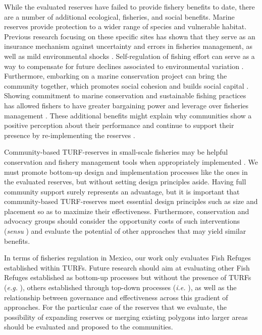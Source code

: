 \documentclass{frontiersSCNS}
\begin{document}
While the evaluated reserves have failed to provide fishery benefits to
date, there are a number of additional ecological, fisheries, and social
benefits. Marine reserves provide protection to a wider range of species
and vulnerable habitat. Previous research focusing on these specific
sites has shown that they serve as an insurance mechanism against
uncertainty and errors in fisheries management, as well as mild
environmental shocks
\citep{micheli_2012-EU,deleo_2015,roberts_2017-J9,aalto}.
Self-regulation of fishing effort can serve as a way to compensate for
future declines associated to environmental variation
\citep{finkbeiner_2018}. Furthermore, embarking on a marine conservation
project can bring the community together, which promotes social cohesion
and builds social capital \citep{fulton_2019}. Showing commitment to
marine conservation and sustainable fishing practices has allowed
fishers to have greater bargaining power and leverage over fisheries
management \citep{prezramrez_2012}. These additional benefits might
explain why communities show a positive perception about their
performance and continue to support their presence by re-implementing
the reserves \citep{ayer_2018}.

Community-based TURF-reserves in small-scale fisheries may be helpful
conservation and fishery management tools when appropriately implemented
\citep{gelcich_2015}. We must promote bottom-up design and
implementation processes like the ones in the evaluated reserves, but
without setting design principles aside. Having full community support
surely represents an advantage, but it is important that community-based
TURF-reserves meet essential design principles such as size and
placement so as to maximize their effectiveness. Furthermore,
conservation and advocacy groups should consider the opportunity costs
of such interventions (\emph{sensu} \citet{smith_2010}) and evaluate the
potential of other approaches that may yield similar benefits.

In terms of fisheries regulation in Mexico, our work only evaluates Fish
Refuges established within TURFs. Future research should aim at
evaluating other Fish Refuges established as bottom-up processes but
without the presence of TURFs (\emph{e.g.} \citet{dof_websiteC_2012}),
others established through top-down processes (\emph{i.e.}
\citet{dof_websiteU_2018}), as well as the relationship between
governance and effectiveness across this gradient of approaches. For the
particular case of the reserves that we evaluate, the possibility of
expanding reserves or merging existing polygons into larger areas should
be evaluated and proposed to the communities.
\end{document}
